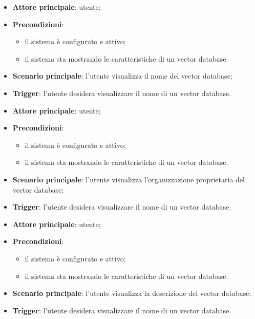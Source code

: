 \documentclass[10pt, a4paper]{article}
\begin{document}
    \begin{itemize}
        \item \textbf{Attore principale}: utente;
        \item \textbf{Precondizioni}:
            \begin{itemize}
                \item il sistema è configurato e attivo;
                \item il sistema sta mostrando le caratteristiche di un vector database.
            \end{itemize}
        \item \textbf{Scenario principale}: l'utente visualizza il nome del vector database;
        \item \textbf{Trigger}: l’utente desidera visualizzare il nome di un vector database.
    \end{itemize}

    \begin{itemize}
        \item \textbf{Attore principale}: utente;
        \item \textbf{Precondizioni}:
            \begin{itemize}
                \item il sistema è configurato e attivo;
                \item il sistema sta mostrando le caratteristiche di un vector database.
            \end{itemize}
        \item \textbf{Scenario principale}: l'utente visualizza l'organizzazione proprietaria del vector database;
        \item \textbf{Trigger}: l’utente desidera visualizzare il nome di un vector database.
    \end{itemize}

    \begin{itemize}
        \item \textbf{Attore principale}: utente;
        \item \textbf{Precondizioni}:
            \begin{itemize}
                \item il sistema è configurato e attivo;
                \item il sistema sta mostrando le caratteristiche di un vector database.
            \end{itemize}
        \item \textbf{Scenario principale}: l'utente visualizza la descrizione del vector database;
        \item \textbf{Trigger}: l’utente desidera visualizzare il nome di un vector database.
    \end{itemize}
\end{document}
